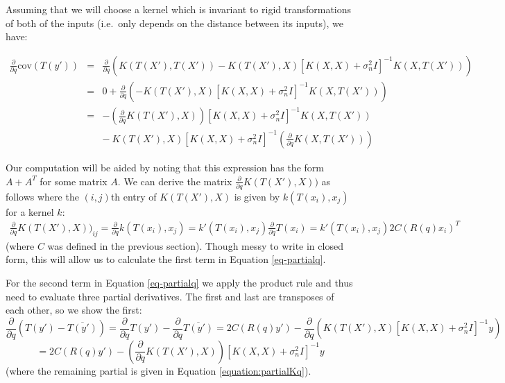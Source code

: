 \documentclass{article} %
\begin{document}
Assuming that we will choose a kernel which is invariant to rigid transformations of both of the inputs (i.e.~only depends on the distance between its inputs), we have:

\begin{eqnarray}
\frac{\partial}{\partial q} \mbox{cov}(T(y')) &=& \frac{\partial}{\partial q} (K(T(X'),T(X')) - K(T(X'),X)[K(X,X) + \sigma_n^2 I]^{-1} K(X,T(X'))) \nonumber\\
&=& 0 + \frac{\partial}{\partial q} (- K(T(X'),X)[K(X,X) + \sigma_n^2 I]^{-1} K(X,T(X'))) \nonumber\\
&=& - \left(\frac{\partial}{\partial q} K(T(X'),X)\right) \left[K(X,X) + \sigma_n^2 I\right]^{-1} K(X,T(X')) \nonumber\\
&&  - ~ K(T(X'),X) [K(X,X) + \sigma_n^2 I]^{-1} \left(\frac{\partial}{\partial q} K(X,T(X'))\right) \label{eq-covpartialq}
\end{eqnarray}
 
Our computation will be aided by noting that this expression has the form $A + A^T$ for some matrix $A$. We can derive the matrix $\frac{\partial}{\partial q} K(T(X'),X))$ as follows where the $(i,j)$th entry of $K(T(X'),X)$ is given by $k(T(x_i), x_j)$ for a kernel $k$:
\begin{eqnarray}
\frac{\partial}{\partial q} K(T(X'),X))_{ij} = \frac{\partial}{\partial q} k(T(x_i), x_j) = k'(T(x_i), x_j) \frac{\partial}{\partial q} T(x_i) = k'(T(x_i), x_j) 2C(R(q)x_i)^T
\label{equation:partialKq}
\end{eqnarray}
(where $C$ was defined in the previous section).
Though messy to write in closed form, this will allow us to calculate the first term in Equation \ref{eq-partialq}.

For the second term in Equation \ref{eq-partialq} we apply the product rule and thus need to evaluate three partial derivatives. The first and last are transposes of each other, so we show the first:
$$\frac{\partial}{\partial q} (T(y') - \overline{T(y')}) = \frac{\partial}{\partial q} T(y') - \frac{\partial}{\partial q} \overline{T(y')}
=  2C(R(q)y') - \frac{\partial}{\partial q} (K(T(X'),X)[K(X,X) + \sigma_n^2 I]^{-1} y)$$
$$= 2C(R(q)y') - \left(\frac{\partial}{\partial q} K(T(X'),X)\right)\left[K(X,X) + \sigma_n^2 I\right]^{-1} y$$
(where the remaining partial is given in Equation \ref{equation:partialKq}).
\end{document}
